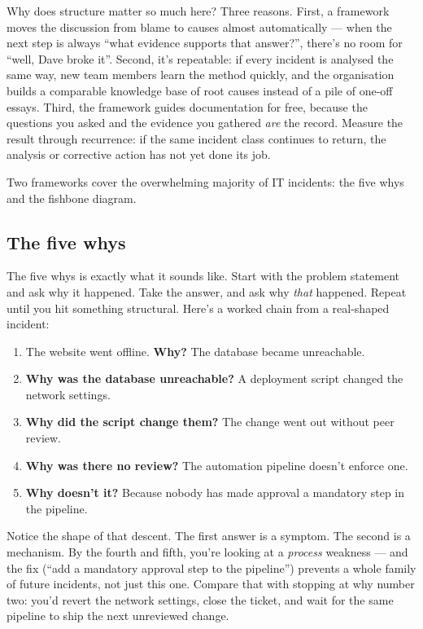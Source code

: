 Why does structure matter so much here? Three reasons. First, a framework moves the discussion from blame to causes almost automatically — when the next step is always ``what evidence supports that answer?'', there's no room for ``well, Dave broke it''. Second, it's repeatable: if every incident is analysed the same way, new team members learn the method quickly, and the organisation builds a comparable knowledge base of root causes instead of a pile of one-off essays. Third, the framework guides documentation for free, because the questions you asked and the evidence you gathered \emph{are} the record. Measure the result through recurrence: if the same incident class continues to return, the analysis or corrective action has not yet done its job.


Two frameworks cover the overwhelming majority of IT incidents: the five whys and the fishbone diagram.



\subsection{The five whys}


The five whys is exactly what it sounds like. Start with the problem statement and ask why it happened. Take the answer, and ask why \emph{that} happened. Repeat until you hit something structural. Here's a worked chain from a real-shaped incident:


\begin{enumerate}[leftmargin=*]
\item The website went offline. \textbf{Why?} The database became unreachable.
\item \textbf{Why was the database unreachable?} A deployment script changed the network settings.
\item \textbf{Why did the script change them?} The change went out without peer review.
\item \textbf{Why was there no review?} The automation pipeline doesn't enforce one.
\item \textbf{Why doesn't it?} Because nobody has made approval a mandatory step in the pipeline.
\end{enumerate}

Notice the shape of that descent. The first answer is a symptom. The second is a mechanism. By the fourth and fifth, you're looking at a \emph{process} weakness — and the fix (``add a mandatory approval step to the pipeline'') prevents a whole family of future incidents, not just this one. Compare that with stopping at why number two: you'd revert the network settings, close the ticket, and wait for the same pipeline to ship the next unreviewed change.



